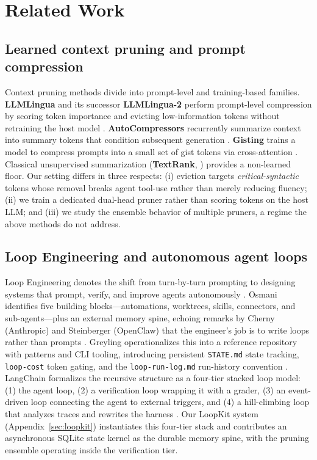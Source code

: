\section{Related Work}
\label{sec:related}

\subsection{Learned context pruning and prompt compression}
\label{sec:rw:compression}

Context pruning methods divide into prompt-level and training-based families.
\textbf{LLMLingua} and its successor \textbf{LLMLingua-2} perform prompt-level
compression by scoring token importance and evicting low-information tokens
without retraining the host model \citep{jiang2023llmlingua,pan2024llmlingua2}.
\textbf{AutoCompressors} recurrently summarize context into summary tokens that
condition subsequent generation \citep{chevalier2023autocompressors}.
\textbf{Gisting} trains a model to compress prompts into a small set of gist
tokens via cross-attention \citep{mu2023gisting}. Classical unsupervised
summarization (\textbf{TextRank}, \citep{mihalcea2004textrank}) provides a
non-learned floor. Our setting differs in three respects: (i) eviction targets
\emph{critical-syntactic} tokens whose removal breaks agent tool-use rather
than merely reducing fluency; (ii) we train a dedicated dual-head pruner rather
than scoring tokens on the host LLM; and (iii) we study the ensemble behavior
of multiple pruners, a regime the above methods do not address.

\subsection{Loop Engineering and autonomous agent loops}
\label{sec:rw:loopeng}

Loop Engineering denotes the shift from turn-by-turn prompting to designing
systems that prompt, verify, and improve agents autonomously
\citep{osmani2026loop}. Osmani identifies five building blocks---automations,
worktrees, skills, connectors, and sub-agents---plus an external memory spine,
echoing remarks by Cherny (Anthropic) and Steinberger (OpenClaw) that the
engineer's job is to write loops rather than prompts
\citep{osmani2026oreilly}. Greyling operationalizes this into a reference
repository with patterns and CLI tooling, introducing persistent
\texttt{STATE.md} state tracking, \texttt{loop-cost} token gating, and the
\texttt{loop-run-log.md} run-history convention \citep{greyling2026loop}.
LangChain formalizes the recursive structure as a four-tier stacked loop
model: (1) the agent loop, (2) a verification loop wrapping it with a grader,
(3) an event-driven loop connecting the agent to external triggers, and (4) a
hill-climbing loop that analyzes traces and rewrites the harness
\citep{langchain2026loops,langchain2026harness}. Our LoopKit system
(Appendix~\ref{sec:loopkit}) instantiates this four-tier stack and contributes
an asynchronous SQLite state kernel as the durable memory spine, with the
pruning ensemble operating inside the verification tier.

